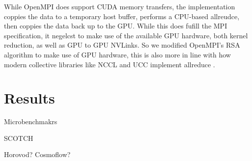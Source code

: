 While OpenMPI does support CUDA memory transfers, the implementation coppies the data to a temporary host buffer, performs a CPU-based allreudce, then coppies the data back up to the GPU.
While this does fufill the MPI specification, it negelcst to make use of the available GPU hardware, both kernel reduction, as well as GPU to GPU NVLinks.
So we modified OpenMPI's RSA algorithm to make use of GPU hardware, this is also more in line with how modern collective libraries like NCCL and UCC implement allreduce \cite{UCC, NCCL}.

\section{Results}









Microbenchmakrs

SCOTCH

Horovod? Cosmoflow?